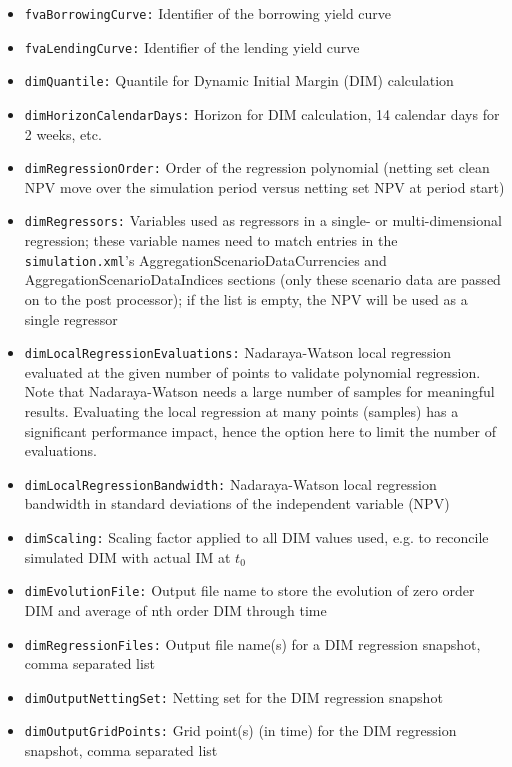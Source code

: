 \documentclass[12pt, a4paper]{article}
\begin{document}
\begin{itemize}
\item {\tt fvaBorrowingCurve:} Identifier of the borrowing yield curve
\item {\tt fvaLendingCurve:} Identifier of the lending yield curve
\item {\tt dimQuantile:} Quantile for Dynamic Initial Margin (DIM) calculation
\item {\tt dimHorizonCalendarDays:} Horizon for DIM calculation, 14 calendar days for 2 weeks, etc.
\item {\tt dimRegressionOrder:} Order of the regression polynomial (netting set clean NPV move over the simulation
period versus netting set NPV at period start)
\item {\tt dimRegressors:} Variables used as regressors in a single- or multi-dimensional regression; these variable
  names need to match entries in the {\tt simulation.xml}'s AggregationScenarioDataCurrencies and
  AggregationScenarioDataIndices sections (only these scenario data are passed on to the post processor); if the list is
  empty, the NPV will be used as a single regressor
\item {\tt dimLocalRegressionEvaluations:} Nadaraya-Watson local regression evaluated at the given number of points to
validate polynomial regression. Note that Nadaraya-Watson needs a large number of samples for meaningful
results. Evaluating the local regression at many points (samples) has a significant performance impact, hence the option
here to limit the number of evaluations.
\item {\tt dimLocalRegressionBandwidth:} Nadaraya-Watson local regression bandwidth in standard deviations of the
independent variable (NPV)
\item {\tt dimScaling:} Scaling factor applied to all DIM values used, e.g. to reconcile simulated DIM with actual IM at
$t_0$
\item {\tt dimEvolutionFile:} Output file name to store the evolution of zero order DIM and average of nth order DIM
through time
\item {\tt dimRegressionFiles:} Output file name(s) for a DIM regression snapshot, comma separated list
\item {\tt dimOutputNettingSet:} Netting set for the DIM regression snapshot
\item {\tt dimOutputGridPoints:} Grid point(s) (in time) for the DIM regression snapshot, comma separated list

\end{itemize}
\end{document}

